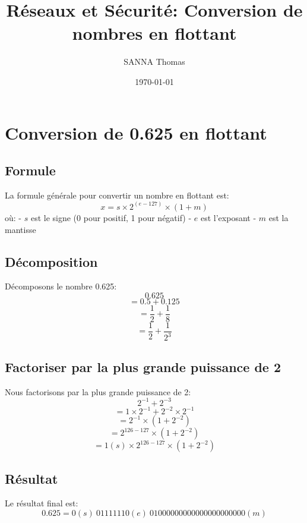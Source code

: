 \documentclass[titlepage]{article}
\begin{document}
\begin{titlepage}
    \title{Réseaux et Sécurité: Conversion de nombres en flottant}
    \author{SANNA Thomas}
    \date{\today}
    \maketitle
\end{titlepage}

\section{Conversion de 0.625 en flottant}

\subsection{Formule}

La formule générale pour convertir un nombre en flottant est:
\[ 
x = s \times 2^{(e-127)} \times (1+m) 
\]
où:
- \( s \) est le signe (0 pour positif, 1 pour négatif)
- \( e \) est l'exposant
- \( m \) est la mantisse

\subsection{Décomposition}

Décomposons le nombre 0.625:
\[ 
0.625
\]
\[ 
= 0.5 + 0.125 
\]
\[ 
= \frac{1}{2} + \frac{1}{8} 
\]
\[ 
= \frac{1}{2} + \frac{1}{2^3} 
\]

\subsection{Factoriser par la plus grande puissance de 2}

Nous factorisons par la plus grande puissance de 2:
\[ 
2^{-1} + 2^{-3} 
\]
\[ 
= 1 \times 2^{-1} + 2^{-2} \times 2^{-1} 
\]
\[ 
= 2^{-1} \times (1 + 2^{-2}) 
\]
\[ 
= 2^{126-127} \times (1 + 2^{-2}) 
\]
\[ 
= 1(s) \times 2^{126-127} \times (1 + 2^{-2}) 
\]

\subsection{Résultat}

Le résultat final est:
\[ 
0.625 =  0(s) \ 01111110(e) \ 01000000000000000000000(m) 
\]

\vspace{2cm}
\end{document}
